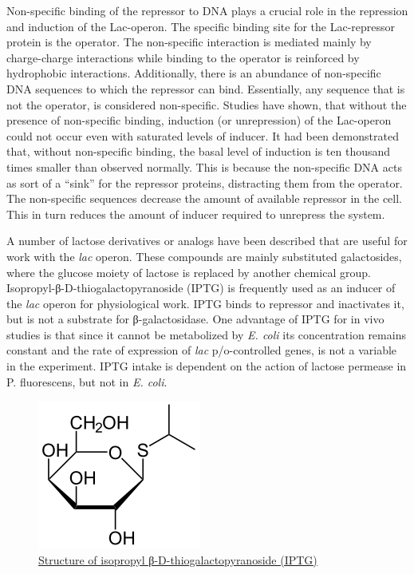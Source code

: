 Non-specific binding of the repressor to DNA plays a crucial role in the repression and induction of the Lac-operon. The specific binding site for the Lac-repressor protein is the operator. The non-specific interaction is mediated mainly by charge-charge interactions while binding to the operator is reinforced by hydrophobic interactions. Additionally, there is an abundance of non-specific DNA sequences to which the repressor can bind. Essentially, any sequence that is not the operator, is considered non-specific. Studies have shown, that without the presence of non-specific binding, induction (or unrepression) of the Lac-operon could not occur even with saturated levels of inducer. It had been demonstrated that, without non-specific binding, the basal level of induction is ten thousand times smaller than observed normally. This is because the non-specific DNA acts as sort of a ``sink'' for the repressor proteins, distracting them from the operator. The non-specific sequences decrease the amount of available repressor in the cell. This in turn reduces the amount of inducer required to unrepress the system.

A number of lactose derivatives or analogs have been described that are useful for work with the \emph{lac} operon. These compounds are mainly substituted galactosides, where the glucose moiety of lactose is replaced by another chemical group. Isopropyl-β-D-thiogalactopyranoside (IPTG) is frequently used as an inducer of the \emph{lac} operon for physiological work. IPTG binds to repressor and inactivates it, but is not a substrate for β-galactosidase. One advantage of IPTG for in vivo studies is that since it cannot be metabolized by \emph{E. coli} its concentration remains constant and the rate of expression of \emph{lac} p/o-controlled genes, is not a variable in the experiment. IPTG intake is dependent on the action of lactose permease in P. fluorescens, but not in \emph{E. coli}.



\begin{figure}

{\centering \includegraphics[width=0.7\linewidth]{./figures/regulation/IPTG2} 

}

\caption{\href{https://commons.wikimedia.org/wiki/File:IPTG2.svg}{Structure of isopropyl β-D-thiogalactopyranoside (IPTG)}}\label{fig:iptgstruc}
\end{figure}

